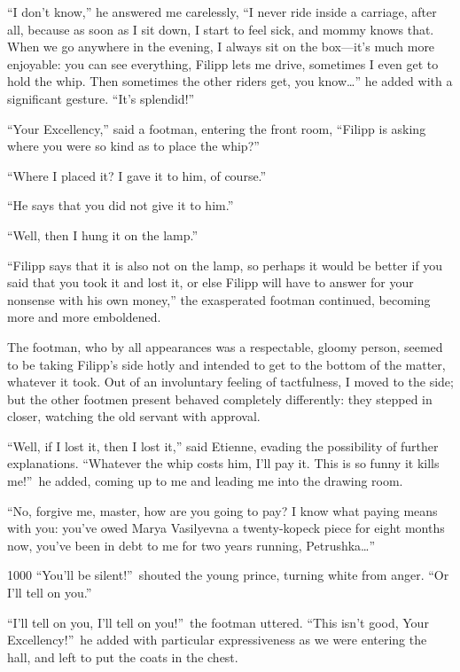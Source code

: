 ``I don't know,'' he answered me carelessly, ``I never ride inside a carriage, after all, because as soon as I sit down, I start to feel sick, and mommy knows that. When we go anywhere in the evening, I always sit on the box---it's much more enjoyable: you can see everything, Filipp lets me drive, sometimes I even get to hold the whip. Then sometimes the other riders get, you know\ldots{}'' he added with a significant gesture. ``It's splendid!'' %

``Your Excellency,'' said a footman, entering the front room, ``Filipp is asking where you were so kind as to place the whip?'' %

``Where I placed it? I gave it to him, of course.'' %

``He says that you did not give it to him.'' %

``Well, then I hung it on the lamp.'' %

``Filipp says that it is also not on the lamp, so perhaps it would be better if you said that you took it and lost it, or else Filipp will have to answer for your nonsense with his own money,'' the exasperated footman continued, becoming more and more emboldened. %

The footman, who by all appearances was a respectable, gloomy person, seemed to be taking Filipp's side hotly and intended to get to the bottom of the matter, whatever it took. Out of an involuntary feeling of tactfulness, I moved to the side; but the other footmen present behaved completely differently: they stepped in closer, watching the old servant with approval.

``Well, if I lost it, then I lost it,'' said Etienne, evading the possibility of further explanations. ``Whatever the whip costs him, I'll pay it. This is so funny it kills me!''~he added, coming up to me and leading me into the drawing room. %

``No, forgive me, master, how are you going to pay? I know what paying means with you: you've owed Marya Vasilyevna a twenty-kopeck piece for eight months now, you've been in debt to me for two years running, Petrushka\ldots{}'' %

\begin{tolerant}{1000}
``You'll be silent!''~shouted the young prince, turning white from anger. ``Or I'll tell on you.'' %
\end{tolerant}

``I'll tell on you, I'll tell on you!''~the footman uttered. ``This isn't good, Your Excellency!''~he added with particular expressiveness as we were entering the hall, and left to put the coats in the chest.

